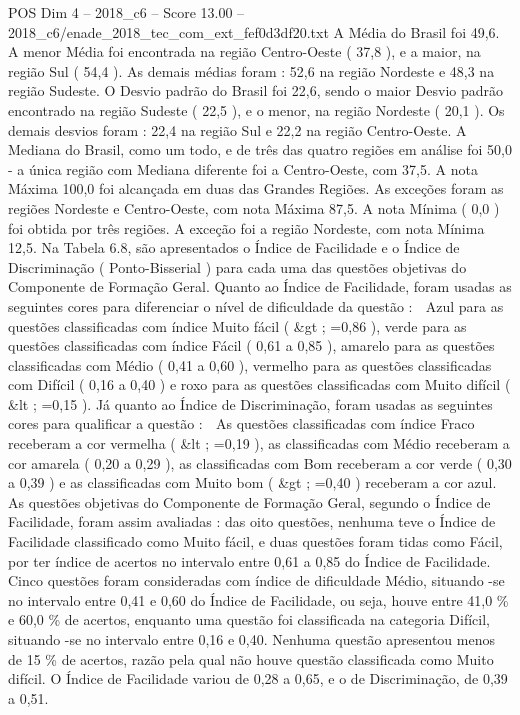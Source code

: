 \begin{textsample}{POS Dim 4 – 2018\_c6 – Score 13.00 – 2018\_c6/enade\_2018\_tec\_com\_ext\_fef0d3df20.txt}
A Média do Brasil foi 49,6.
A menor Média foi encontrada na região Centro-Oeste ( 37,8 ), e a maior, na região Sul ( 54,4 ).
As demais médias foram : 52,6 na região Nordeste e 48,3 na região Sudeste.
O Desvio padrão do Brasil foi 22,6, sendo o maior Desvio padrão encontrado na região Sudeste ( 22,5 ), e o menor, na região Nordeste ( 20,1 ).
Os demais desvios foram : 22,4 na região Sul e 22,2 na região Centro-Oeste.
A Mediana do Brasil, como um todo, e de três das quatro regiões em análise foi 50,0 - a única região com Mediana diferente foi a Centro-Oeste, com 37,5.
A nota Máxima 100,0 foi alcançada em duas das Grandes Regiões.
As exceções foram as regiões Nordeste e Centro-Oeste, com nota Máxima 87,5.
A nota Mínima ( 0,0 ) foi obtida por três regiões.
A exceção foi a região Nordeste, com nota Mínima 12,5.
Na Tabela 6.8, são apresentados o Índice de Facilidade e o Índice de Discriminação ( Ponto-Bisserial ) para cada uma das questões objetivas do Componente de Formação Geral.
Quanto ao Índice de Facilidade, foram usadas as seguintes cores para diferenciar o nível de dificuldade da questão :  Azul para as questões classificadas com índice Muito fácil ( \&gt ; =0,86 ), verde para as questões classificadas com índice Fácil ( 0,61 a 0,85 ), amarelo para as questões classificadas com Médio ( 0,41 a 0,60 ), vermelho para as questões classificadas com Difícil ( 0,16 a 0,40 ) e roxo para as questões classificadas com Muito difícil ( \&lt ; =0,15 ).
Já quanto ao Índice de Discriminação, foram usadas as seguintes cores para qualificar a questão :  As questões classificadas com índice Fraco receberam a cor vermelha ( \&lt ; =0,19 ), as classificadas com Médio receberam a cor amarela ( 0,20 a 0,29 ), as classificadas com Bom receberam a cor verde ( 0,30 a 0,39 ) e as classificadas com Muito bom ( \&gt ; =0,40 ) receberam a cor azul.
As questões objetivas do Componente de Formação Geral, segundo o Índice de Facilidade, foram assim avaliadas : das oito questões, nenhuma teve o Índice de Facilidade classificado como Muito fácil, e duas questões foram tidas como Fácil, por ter índice de acertos no intervalo entre 0,61 a 0,85 do Índice de Facilidade.
Cinco questões foram consideradas com índice de dificuldade Médio, situando -se no intervalo entre 0,41 e 0,60 do Índice de Facilidade, ou seja, houve entre 41,0 \% e 60,0 \% de acertos, enquanto uma questão foi classificada na categoria Difícil, situando -se no intervalo entre 0,16 e 0,40.
Nenhuma questão apresentou menos de 15 \% de acertos, razão pela qual não houve questão classificada como Muito difícil.
O Índice de Facilidade variou de 0,28 a 0,65, e o de Discriminação, de 0,39 a 0,51.

\end{textsample}
